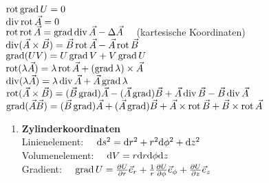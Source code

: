\documentclass{atistandalonetask}
\begin{document}
\begin{atiTask}[
]
$\operatorname{rot} \operatorname{grad} U = 0$ \\[0.25em]
$\operatorname{div} \operatorname{rot} \vec{A} = 0$ \\[0.25em]
$\operatorname{rot} \operatorname{rot} \vec{A} = \operatorname{grad} \operatorname{div} \vec{A} - \Delta \vec{A} \quad$ (kartesische Koordinaten) \\[0.25em]
$\operatorname{div}( \vec{A} \times \vec{B} ) =  \vec{B} \operatorname{rot} \vec{A} - \vec{A} \operatorname{rot} \vec{B}$ \\[0.25em]
$\operatorname{grad} ( U V) = U \operatorname{grad} V + V \operatorname{grad} U$ \\[0.25em]
$ \operatorname{rot} ( \lambda \vec{A} ) = \lambda \operatorname{rot} \vec{A} + (\operatorname{grad} \lambda ) \times \vec{A}$ \\[0.25em]
$ \operatorname{div} ( \lambda \vec{A}) = \lambda \operatorname{div} \vec{A} + \vec{A} \operatorname{grad} \lambda$ \\[0.25em]
$ \operatorname{rot} ( \vec{A} \times \vec{B}) = (\vec{B} \operatorname{grad} ) \vec{A} - (\vec{A} \operatorname{grad} ) \vec{B} + \vec{A} \operatorname{div} \vec{B} - \vec{B} \operatorname{div} \vec{A}$ \\[0.25em]
$ \operatorname{grad}(\vec{A} \vec{B}) = (\vec{B} \operatorname{grad} ) \vec{A} + (\vec{A} \operatorname{grad} ) \vec{B} + \vec{A} \times \operatorname{rot} \vec{B} + \vec{B} \times \operatorname{rot} \vec{A}$ \\[0.25em]
\begin{enumerate}
  \renewcommand{\labelenumi}{\textbf{\alph{enumi})}}
  \item \textbf{Zylinderkoordinaten}\\[1em]
  Linienelement: $\quad \mathrm{d} s^2 = \mathrm{d} r^2 + r^2 \mathrm{d} \phi^2 + \mathrm{d} z^2$ \\[1em] 
  Volumenelement: $\quad \mathrm{d} V = r \mathrm{d} r \mathrm{d} \phi \mathrm{d} z$ \\[1em]
  Gradient: $\quad \gradient U = \leibnizPartialDerivative{U}{r}\vec{e}_r + \frac{1}{r} \leibnizPartialDerivative{U}{\phi} \vec{e}_\phi + \leibnizPartialDerivative{U}{z} \vec{e}_z$ \\[1em] 

\end{enumerate}
\end{atiTask}
\end{document}
